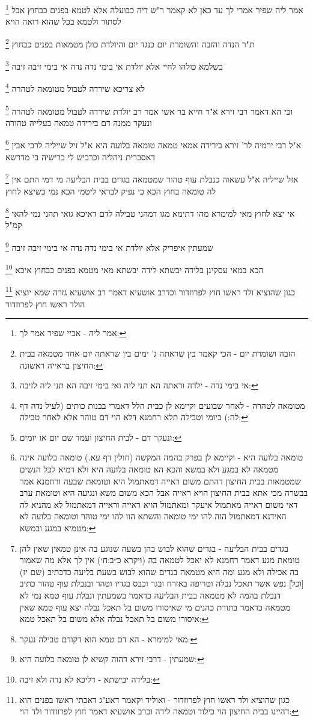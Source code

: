 \documentclass[12pt, openany]{book}
\newcommand{\footnotecomment}[1]{
	\renewcommand\thefootnote{}
	\footnote{#1}}
\newcommand{\commenta}[1]{\footnotecomment{#1}}
\begin{document}
{{\commenta{אמר ליה - אביי שפיר אמר לך:}
אמר ליה שפיר אמרי לך עד כאן לא קאמר ר"ש דיה כבועלה אלא לטמא בפנים כבחוץ אבל לסתור ולטמא בכל שהוא רואה הויא
\commenta{הזבה ושומרת יום - הכי קאמר בין שראתה ג' ימים בין שראתה יום אחד מטמאה בבית החיצון בראייה ראשונה:}
ת"ר הנדה והזבה והשומרת יום כנגד יום והיולדת כולן מטמאות בפנים כבחוץ 
\commenta{אי בימי נדה - ילדה וראתה הא תני ליה ואי בימי זיבה הא תני ליה לזיבה:}
בשלמא כולהו לחיי אלא יולדת אי בימי נדה נדה אי בימי זיבה זיבה 
\commenta{מטומאה לטהרה - לאחר שבועים וקיימא לן כבית הלל דאמרי בבנות כותים (לעיל נדה דף לה:) ביומי וטבילה תלא רחמנא דלא הוי דם טוהר אלא לאחר טבילה:}
לא צריכא שירדה לטבול מטומאה לטהרה 
\commenta{ונעקר דם - לבית החיצון ועמד שם יום או יומים:}
וכי הא דאמר רבי זירא א"ר חייא בר אשי אמר רב יולדת שירדה לטבול מטומאה לטהרה ונעקר ממנה דם בירידה טמאה בעלייה טהורה 
\commenta{טומאה בלועה היא - וקיימא לן בפרק בהמה המקשה (חולין דף עא.) טומאה בלועה אינה מטמאה לא במגע ולא במשא והכא הא טומאה בלועה היא ולא דמיא לכל הנשים שמטמאות בבית החיצון דהתם משום ראייה דמאתמול היא וטומאת שבעה ורחמנא אמר בבשרה מכי אתא בבית החיצון הויא ראייה אבל הכא משום משא ונגיעה היא וטומאת ערב דאי משום ראייה מאתמול איעקר ומאתמול הויא ראייה וראייה דמאתמול לא מהניא לה האידנא דמאתמול הוה להו ימי טומאה והשתא הוו להו ימי טוהר וטומאה בלועה לא מטמיא במגע ובמשא:}
א"ל רבי ירמיה לר' זירא בירידה אמאי טמאה טומאה בלועה היא א"ל זיל שייליה לרבי אבין דאסברית ניהליה וכרכיש לי ברישיה בי מדרשא 
\commenta{בגדים בבית הבליעה - בגדים שהוא לבוש בהן בשעה שנוגע בה אינן טמאין שאין להן טומאת מגע דאמר רחמנא לא יאכל לטמאה בה (ויקרא כ״ב:ח׳) אין לך אלא מה שאמור בה אכילה ולא מגע ומה היא מטמאה בגדים שהוא לבוש בשעת בליעה כדכתיב (שם יז) [וכל] נפש אשר תאכל נבלה וטריפה באזרח ובגר וכבס בגדיו וטהר ובנבלת עוף טהור כתיב דנבלת בהמה לא מטמאה בבית הבליעה כדאמר בשמעתין ונבלת עוף טמא נמי לא מטמאה כדאמר בתורת כהנים מי שאיסורו משום בל תאכל נבלה יצא עוף טמא שאין איסורו משום בל תאכל נבלה אלא משום בל תאכל טמא:}
אזל שייליה א"ל עשאוה כנבלת עוף טהור שמטמאה בגדים בבית הבליעה מי דמי
התם אין לה טומאה בחוץ הכא כי נפיק לבראי ליטמי הכא נמי כשיצא לחוץ 
\commenta{מאי למימרא - הא דם טמא הוא דקודם טבילה נעקר:}
אי יצא לחוץ מאי למימרא מהו דתימא מגו דמהני טבילה לדם דאיכא גואי תהני נמי להאי קמ"ל 
\commenta{שמעתין - דרבי זירא דהוה קשיא לן טומאה בלועה היא:}
שמעתין איפריק אלא יולדת אי בימי נדה נדה אי בימי זיבה זיבה 
\commenta{בלידה יבישתא - דליכא לא נדה ולא זיבה:}
הכא במאי עסקינן בלידה יבשתא לידה יבשתא מאי מטמא בפנים כבחוץ איכא 
\commenta{כגון שהוציא ולד ראשו חוץ לפרוזדור - ואוליד וקאמר דאע"ג דאכתי ראשו בפנים הוא דהיינו בבית החיצון הוי כילוד וטמאה לידה וכרב אושעיא דאמר חוץ לפרוזדור ולד הוי:}
כגון שהוציא ולד ראשו חוץ לפרוזדור וכדרב אושעיא דאמר רב אושעיא גזרה שמא יוציא הולד ראשו חוץ לפרוזדור 
}}
\end{document}
